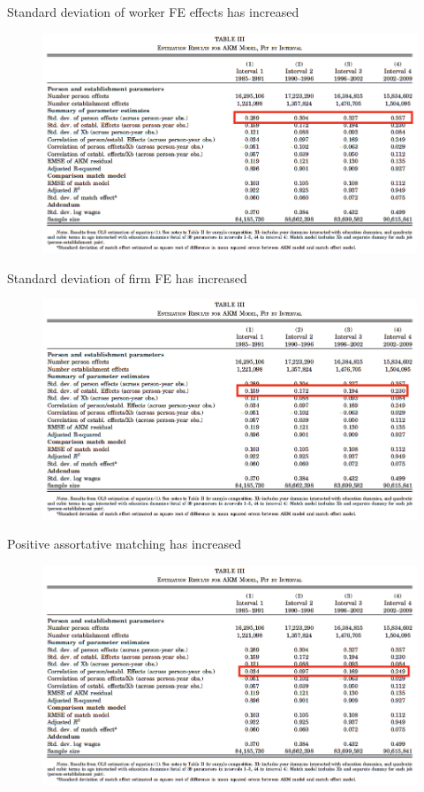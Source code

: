 \documentclass[notes=show]{beamer}
\begin{document}
\begin{frame}{Standard deviation of worker FE effects has increased}
\begin{figure}[p!]
 \includegraphics[width=\textwidth]{figures/Table3b} 
\end{figure}
\end{frame}

\begin{frame}{Standard deviation of firm FE has increased}
\begin{figure}[p!]
 \includegraphics[width=\textwidth]{figures/Table3c} 
\end{figure}
\end{frame}

\begin{frame}{Positive assortative matching has increased}
\begin{figure}[p!]
 \includegraphics[width=\textwidth]{figures/Table3d} 
\end{figure}
\end{frame}
\end{document}

